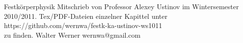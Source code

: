 





  



\begin{titlepage}
\begin{center}
\vspace*{\fill}{}
\vfill {{\Huge Festkörperphysik}}
\vfill {Mitschrieb von Professor Alexey Ustinov im Wintersemester 2010/2011. Tex/PDF-Dateien einzelner Kapittel unter\\
https://github.com/wernwa/festk-ka-ustinov-ws1011\\
zu finden.
}
\vfill {Walter Werner wernwa@gmail.com}
\end{center}
\end{titlepage}


\tableofcontents
\setcounter{chapter}{0}








\setcounter{chapter}{7}








